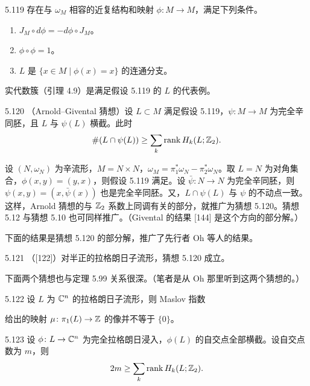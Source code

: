 \begin{assumption}{5.119}
  存在与 $\omega_M$ 相容的近复结构和映射 $\phi\colon M\to M$，满足下列条件。
  \begin{enumerate}[label=(\arabic*),leftmargin=2.4em,itemsep=1pt,topsep=2pt]
    \item $J_M\circ d\phi=-d\phi\circ J_M$。
    \item $\phi\circ\phi=1$。
    \item $L$ 是 $\{x\in M\mid\phi(x)=x\}$ 的连通分支。
  \end{enumerate}
\end{assumption}

实代数簇（引理 4.9）是满足假设 5.119 的 $L$ 的代表例。

\begin{conjecture}{5.120}
  （Arnold–Givental 猜想）设 $L\subset M$ 满足假设 5.119，$\psi\colon M\to M$ 为完全辛同胚，且 $L$ 与 $\psi(L)$ 横截。此时
  \[
    \#(L\cap\psi(L))\ge\sum_k\mathrm{rank}\,H_k(L;\mathbb{Z}_2).
  \]
\end{conjecture}

设 $(N,\omega_N)$ 为辛流形，$M=N\times N$，$\omega_M=\pi_1^*\omega_N-\pi_2^*\omega_N$。取 $L=N$ 为对角集合，$\phi(x,y)=(y,x)$，则假设 5.119 满足。设 $\bar\psi\colon N\to N$ 为完全辛同胚，则 $\psi(x,y)=(x,\bar\psi(x))$ 也是完全辛同胚。又，$L\cap\psi(L)$ 与 $\psi$ 的不动点一致。这样，Arnold 猜想的与 $\mathbb{Z}_2$ 系数上同调有关的部分，就推广为猜想 5.120。猜想 5.12 与猜想 5.10 也可同样推广。（Givental 的结果 [144] 是这个方向的部分解。）

下面的结果是猜想 5.120 的部分解，推广了先行者 Oh 等人的结果。

\begin{theorem}{5.121}
  （[122]）对半正的拉格朗日子流形，猜想 5.120 成立。
\end{theorem}

下面两个猜想也与定理 5.99 关系很深。（笔者是从 Oh 那里听到这两个猜想的。）

\begin{conjecture}{5.122}
  设 $L$ 为 $\mathbb{C}^n$ 的拉格朗日子流形，则 Maslov 指数

  给出的映射 $\mu\colon\pi_1(L)\to\mathbb{Z}$ 的像并不等于 $\{0\}$。
\end{conjecture}

\begin{conjecture}{5.123}
  设 $\phi\colon L\to\mathbb{C}^n$ 为完全拉格朗日浸入，$\phi(L)$ 的自交点全部横截。设自交点数为 $m$，则
  \[
    2m\ge\sum_k\mathrm{rank}\,H_k(L;\mathbb{Z}_2).
  \]
\end{conjecture}

